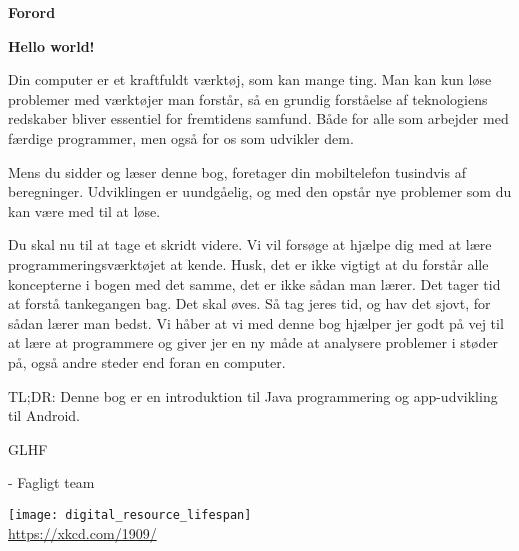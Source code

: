\cleardoublepage
\begin{titlepage}
	{\centering
	\vspace{3cm}
	{\Huge\sffamily\bfseries Forord \par} \vspace{0.5cm}}


	\noindent
	{\large\bfseries Hello world! \par}
	
	Din computer er et kraftfuldt værktøj, som kan mange ting. Man kan kun løse problemer med værktøjer man forstår, så en grundig forståelse af teknologiens redskaber bliver essentiel for fremtidens samfund. Både for alle som arbejder med færdige programmer, men også for os som udvikler dem. 
	
	Mens du sidder og læser denne bog, foretager din mobiltelefon tusindvis af beregninger. Udviklingen er uundgåelig, og med den opstår nye problemer som du kan være med til at løse. 
	
	Du skal nu til at tage et skridt videre. Vi vil forsøge at hjælpe dig med at lære programmeringsværktøjet at kende.
	Husk, det er ikke vigtigt at du forstår alle koncepterne i bogen med det samme, det er ikke sådan man lærer.
	Det tager tid at forstå tankegangen bag. Det skal øves.
	Så tag jeres tid, og hav det sjovt, for sådan lærer man bedst.
	Vi håber at vi med denne bog hjælper jer godt på vej til at lære at programmere og giver jer en ny måde at analysere problemer i støder på, også andre steder end foran en computer.
	
	TL;DR: Denne bog er en introduktion til Java programmering og app-udvikling til Android. 
	
	GLHF
	
	- Fagligt team
	
	{\centering
	{\texttt{[image: digital\_resource\_lifespan]}\\
		\tiny \url{https://xkcd.com/1909/} \par} \vspace{0.5cm}}
\end{titlepage}
